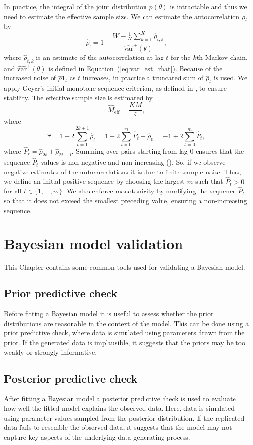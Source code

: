 In practice, the integral of the joint distribution $p(\theta)$ is intractable and thus we need to estimate the effective sample size. We can estimate the autocorrelation $\rho_t$ by
\[
	\hat{\rho}_t=1-\frac{W-\frac{1}{K}\sum_{k=1}^K\hat{\rho}_{t,k}}{\widehat{\text{var}}^+(\theta)},
\]
where $\hat{\rho}_{t,k}$ is an estimate of the autocorrelation at lag $t$ for the $k$th Markov chain, and $\widehat{\text{var}}^+(\theta)$ is defined in Equation~(\ref{eq:var_est_rhat}). Because of the increased noise of $\hat{\rho}1_{t}$ as $t$ increases, in practice a truncated sum of $\hat{\rho}_t$ is used. We apply Geyer’s initial monotone sequence criterion, as defined in \cite{Geyer1992}, to ensure stability. The effective sample size is estimated by 
\[
	\widehat{M}_{\text{eff}}=\frac{KM}{\hat{\tau}},
\]
where
\[
	\hat{\tau}=1+2\sum_{t=1}^{2k+1}\hat{\rho}_t=1+2\sum_{t=0}^m \hat{P}_{t}-\hat{\rho}_0=-1+2\sum_{t=0}^m \hat{P}_{t},
\]
where $\hat{P}_{t}=\hat{\rho}_{2t}+\hat{\rho}_{2t+1}$. Summing over pairs starting from lag 0 ensures that the sequence 
$\hat{P}_t$ values is non-negative and non-increasing (\cite{Geyer1992}). So, if we observe negative estimates of the autocorrelations it is due to finite-sample noise. Thus, we define an initial positive sequence by choosing the largest $m$ such that $\hat{P}_t>0$ for all $t \in \{1,\dots,m\}$. We also enforce monotonicity by modifying the sequence $\hat{P}_t$ so that it does not exceed the smallest preceding value, ensuring a non-increasing sequence.

\chapter{Bayesian model validation}
\label{chap:Bayesian_model_val}
This Chapter contains some common tools used for validating a Bayesian model.
\section*{Prior predictive check}
Before fitting a Bayesian model it is useful to assess whether the prior distributions are reasonable in the context of the model. This can be done using a prior predictive check, where data is simulated using parameters drawn from the prior. If the generated data is implausible, it suggests that the priors may be too weakly or strongly informative.

\section*{Posterior predictive check}
After fitting a Bayesian model a posterior predictive check is used to evaluate how well the fitted model explains the observed data. Here, data is simulated using parameter values sampled from the posterior distribution. If the replicated data fails to resemble the observed data, it suggests that the model may not capture key aspects of the underlying data-generating process.

